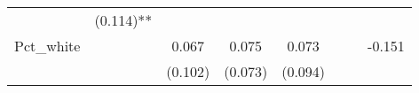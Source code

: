 \documentclass[12pt,twoside]{reedthesis}
\begin{document}
\begin{longtable}[]{@{}lccccccc@{}}
\begin{minipage}[t]{0.10\columnwidth}
  \strut
  \end{minipage} & \begin{minipage}[t]{0.10\columnwidth}\centering\strut
  (0.114)**\strut
  \end{minipage}\tabularnewline
  \begin{minipage}[t]{0.11\columnwidth}\raggedright\strut
  Pct\_white\strut
  \end{minipage} & \begin{minipage}[t]{0.08\columnwidth}\centering\strut
  \strut
  \end{minipage} & \begin{minipage}[t]{0.10\columnwidth}\centering\strut
  0.067\strut
  \end{minipage} & \begin{minipage}[t]{0.10\columnwidth}\centering\strut
  0.075\strut
  \end{minipage} & \begin{minipage}[t]{0.10\columnwidth}\centering\strut
  0.073\strut
  \end{minipage} & \begin{minipage}[t]{0.10\columnwidth}\centering\strut
  \strut
  \end{minipage} & \begin{minipage}[t]{0.10\columnwidth}\centering\strut
  \strut
  \end{minipage} & \begin{minipage}[t]{0.10\columnwidth}\centering\strut
  -0.151\strut
  \end{minipage}\tabularnewline
  \begin{minipage}[t]{0.11\columnwidth}\raggedright\strut
  \strut
  \end{minipage} & \begin{minipage}[t]{0.08\columnwidth}\centering\strut
  \strut
  \end{minipage} & \begin{minipage}[t]{0.10\columnwidth}\centering\strut
  (0.102)\strut
  \end{minipage} & \begin{minipage}[t]{0.10\columnwidth}\centering\strut
  (0.073)\strut
  \end{minipage} & \begin{minipage}[t]{0.10\columnwidth}\centering\strut
  (0.094)\strut
  \end{minipage} & \begin{minipage}[t]{0.10\columnwidth}\centering\strut
  \strut
  \end{minipage} & \begin{minipage}[t]{0.10\columnwidth}\centering\strut

\end{minipage}
\end{longtable}
\end{document}
